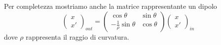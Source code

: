 Per completezza mostriamo anche la matrice rappresentante un dipolo
\begin{equation}
\begin{pmatrix}
x\\x'
\end{pmatrix}_{out}
=\begin{pmatrix}
\cos\theta & \sin\theta \\-\frac{1}{\rho}\sin\theta & \cos\theta
\end{pmatrix}
\begin{pmatrix}
x\\x'
\end{pmatrix}_{in}
\end{equation}
dove $\rho$ rappresenta il raggio di curvatura.
